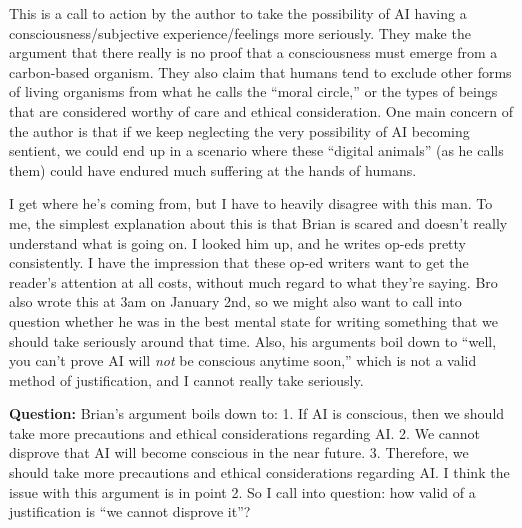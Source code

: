 This is a call to action by the author to take the possibility of AI having a consciousness/subjective experience/feelings more seriously.
They make the argument that there really is no proof that a consciousness must emerge from a carbon-based organism.
They also claim that humans tend to exclude other forms of living organisms from what he calls the ``moral circle,'' or the types of beings that are considered worthy of care and ethical consideration.
One main concern of the author is that if we keep neglecting the very possibility of AI becoming sentient, we could end up in a scenario where these ``digital animals'' (as he calls them) could have endured much suffering at the hands of humans.

I get where he's coming from, but I have to heavily disagree with this man.
To me, the simplest explanation about this is that Brian is scared and doesn't really understand what is going on.
I looked him up, and he writes op-eds pretty consistently.
I have the impression that these op-ed writers want to get the reader's attention at all costs, without much regard to what they're saying.
Bro also wrote this at 3am on January 2nd, so we might also want to call into question whether he was in the best mental state for writing something that we should take seriously around that time.
Also, his arguments boil down to ``well, you can't prove AI will \textit{not} be conscious anytime soon,'' which is not a valid method of justification, and I cannot really take seriously.

\textbf{Question:}
Brian's argument boils down to:
1. If AI is conscious, then we should take more precautions and ethical considerations regarding AI.
2. We cannot disprove that AI will become conscious in the near future.
3. Therefore, we should take more precautions and ethical considerations regarding AI.
I think the issue with this argument is in point 2.
So I call into question: how valid of a justification is ``we cannot disprove it''?

